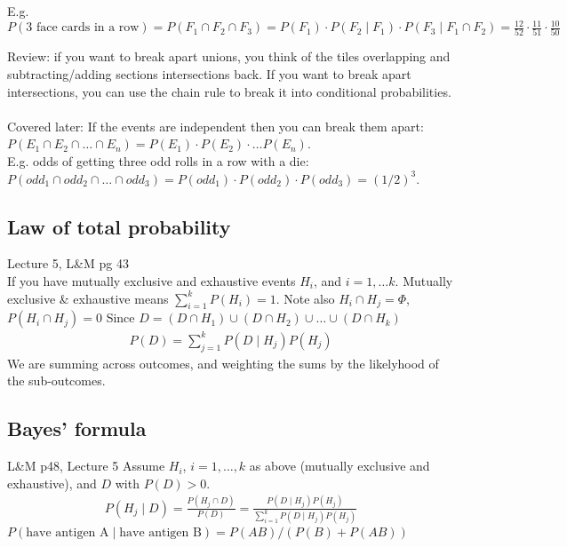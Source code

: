  E.g. $P(\mbox{3 face cards in a row}) = P(F_1 \cap F_2 \cap F_3) = P(F_1) \cdot P(F_2 \mid F_1) \cdot P(F_3 \mid F_1 \cap F_2) = \frac{12}{52} \cdot \frac{11}{51} \cdot \frac{10}{50}$
 
Review: if you want to break apart unions, you think of the tiles overlapping and subtracting/adding sections intersections back.  If you want to break apart intersections, you can use the chain rule to break it into conditional probabilities.   \hfill \\
 \hfill \\
 
 {\tiny Covered later:} If the events are independent then you can break them apart: $P(E_1 \cap E_2 \cap \dots \cap E_n) = P(E_1)\cdot P(E_2)\cdot \dots P(E_n)$.   \hfill \\
 E.g. odds of getting three odd rolls in a row with a die:  $P(odd_1 \cap odd_2 \cap \dots \cap odd_3) = P(odd_1)\cdot P(odd_2)\cdot P(odd_3) = (1/2)^3$.
 
 \subsection{Law of total probability} {\tiny Lecture 5, L\&M pg 43}   \hfill \\
 If you have mutually exclusive and exhaustive events $H_i$, and $i = 1, \dots k$.  Mutually exclusive \& exhaustive means $\sum_{i=1}^k P(H_i) = 1$.  Note also $H_i \cap H_j = \Phi$, $P(H_i \cap H_j) = 0$  
 Since $D = (D \cap H_1) \cup (D \cap H_2) \cup \dots \cup  (D \cap H_k)$
	\begin{align*}
 		P(D) = \sum_{j=1}^k P(D \mid H_j) P(H_j) 
  	\end{align*}
We are summing across outcomes, and weighting the sums by the likelyhood of the sub-outcomes.
 
 \subsection{Bayes' formula} {\tiny L\&M p48, Lecture 5}
 Assume $H_i$, $i = 1, \dots, k$ as above (mutually exclusive and exhaustive), and $D$ with $P(D) > 0$.
 	\begin{align*}
		P(H_j \mid D) = \frac{P(H_j \cap D)}{P(D)} = \frac{P(D \mid H_j) P(H_j) }{\sum_{i=1}^k P(D \mid H_j) P(H_j) }
	\end{align*}
$P(\mbox{have antigen A} \mid \mbox{have antigen B}) = P(AB)/(P(B) + P(AB)) $  \hfill \\
 \hfill \\
 
